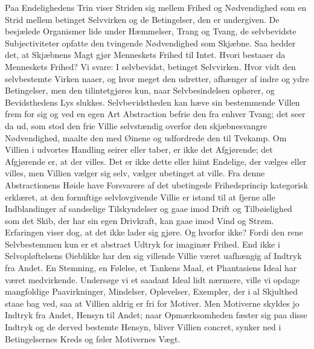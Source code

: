 \documentclass[12pt]{article}
\newcommand{\opage}[1]{\marginnote{\footnotesize\textit{[#1]}}}
\begin{document}
Paa Endelighedens Trin viser Striden sig mellem Frihed og
Nødvendighed som en Strid mellem betinget Selvvirken og de
Betingelser, den er undergiven. De besjælede Organismer lide under
Hæmmelser, Trang og Tvang, de selvbevidste Subjectiviteter opfatte
den tvingende Nødvendighed som Skjæbne. Saa hedder det, at Skjæbnens
Magt gjør Menneskets Frihed til
\opage{62} Intet. Hvori bestaaer da Menneskets Frihed? Vi svare: I selvbevidst,
betinget Selvvirken. Hvor vidt den selvbestemte Virken naaer, og
hvor meget den udretter, afhænger af indre og ydre Betingelser, men
den tilintetgjøres kun, naar Selvbesindelsen ophører, og
Bevidsthedens Lys slukkes. Selvbevidstheden kan hæve sin bestemmende
Villen frem for sig og ved en egen Art Abstraction befrie den fra
enhver Tvang; det seer da ud, som stod den frie Villie selvstændig
overfor den skjæbnesvangre Nødvendighed, maalte den med Øinene og
udfordrede den til Tvekamp. Om Villien i udvortes Handling seirer
eller taber, er ikke det Afgjørende; det Afgjørende er, at der
villes. Det er ikke dette eller hiint Endelige, der vælges eller
villes, men Villien vælger sig selv, vælger ubetinget at ville. Fra
denne Abstractionens Høide have Forsvarere af det ubetingede
Frihedsprincip kategorisk erklæret, at den fornuftige selvlovgivende
Villie er istand til at fjerne alle Indblandinger af sandselige
Tilskyndelser og gaae imod Drift og Tilbøielighed som det Skib, der
har sin egen Drivkraft, kan gaae imod Vind og Strøm. Erfaringen
viser dog, at det ikke lader sig gjøre. Og hvorfor ikke? Fordi den
rene Selvbestemmen kun er et abstract Udtryk for imaginær Frihed.
End ikke i Selvopløftelsens Øieblikke har den sig villende Villie
været uafhængig af Indtryk fra Andet. En Stemning, en Følelse, et
Tankens Maal, et Phantasiens Ideal har været medvirkende. Undersøge
vi et saadant Ideal lidt nærmere, ville vi opdage mangfoldige
Paavirkninger, Mindelser, Oplevelser, Exempler, der i al Skjulthed
staae bag ved, saa at Villien aldrig er fri for Motiver. Men
Motiverne skyldes jo Indtryk fra Andet, Hensyn til Andet; naar
Opmærksomheden fæster sig paa disse Indtryk og de derved bestemte
Hensyn, bliver Villien concret, synker ned i Betingelsernes Kreds og
føler Motivernes Vægt.
\end{document}
